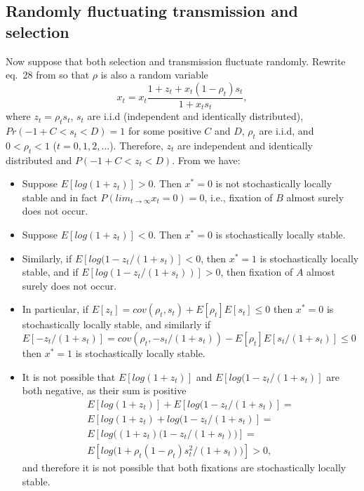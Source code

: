 \documentclass[14pt]{extarticle}
\begin{document}
\subsection*{Randomly fluctuating transmission and selection}

Now suppose that both selection and transmission fluctuate randomly.
Rewrite eq.~28 from \citet{Ram2018} so that $\rho$ is also a random variable
\begin{equation}
x_t = x_t \frac{1 + z_t + x_t (1 - \rho_t) s_t}{1 + x_t s_t},
\end{equation}
where $z_t=\rho_t s_t$, $s_t$ are i.i.d (independent and identically distributed), $Pr(-1+C<s_t<D)=1$ for some positive $C$ and $D$, $\rho_t$ are i.i.d, and  $0<\rho_t<1$ ($t=0,1,2,\ldots$).
Therefore, $z_t$ are independent and identically distributed and $P(-1+C < z_t < D)$. 
From \citet[][results~6 and 7]{Ram2018} we have:
\begin{itemize}
\item Suppose $E[log(1+z_t)]>0$. Then $x^*=0$ is not stochastically locally stable and in fact $P(lim_{t \to \infty} x_t=0) = 0$, i.e., fixation of $B$ almost surely does not occur.
\item Suppose $E[log(1+z_t)]<0$. Then $x^*=0$ is stochastically locally stable. 
\item Similarly, if $E[log(1-z_t/(1+s_t)]<0$, then $x^*=1$ is stochastically locally stable, and if $E[log(1-z_t/(1+s_t))]>0$, then fixation of $A$ almost surely does not occur.
\item In particular, if $E[z_t] = cov(\rho_t, s_t) + E[\rho_t] E[s_t] \le 0$ then $x^*=0$ is stochastically locally stable, and similarly if $E[-z_t/(1+s_t)] = cov(\rho_t, -s_t/(1+s_t)) - E[\rho_t] E[s_t/(1+s_t)] \le 0$ then $x^*=1$ is stochastically locally stable.
\item It is not possible that $E[log(1+z_t)]$ and $E[log(1-z_t/(1+s_t)]$ are both negative, as their sum is positive
\begin{multline}
E[log(1+z_t)] + E[log(1-z_t/(1+s_t)] = \\
E[log(1+z_t) + log(1-z_t/(1+s_t)]= \\
E[log\big((1+z_t)(1-z_t/(1+s_t)\big)]= \\
E[log\big( 1+\rho_t(1-\rho_t)s_t^2/(1+s_t) \big)] > 0,
\end{multline}
and therefore it is not possible that both fixations are stochastically locally stable.
\end{itemize}
\end{document}
